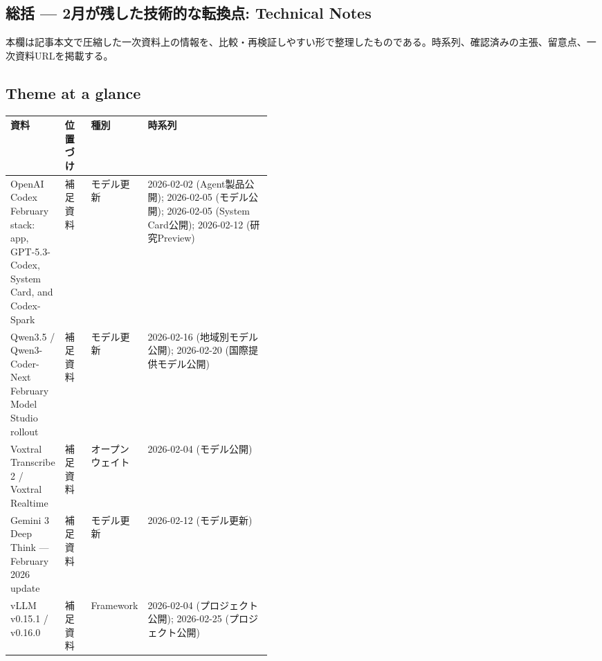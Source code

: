 \subsection*{総括 — 2月が残した技術的な転換点: Technical Notes}
本欄は記事本文で圧縮した一次資料上の情報を、比較・再検証しやすい形で整理したものである。時系列、確認済みの主張、留意点、一次資料URLを掲載する。
\medskip
\subsection*{Theme at a glance}
\begin{center}
\footnotesize
\begin{tabularx}{\linewidth}{@{}p{0.20\linewidth}p{0.10\linewidth}p{0.14\linewidth}X@{}}
\toprule
資料 & 位置づけ & 種別 & 時系列 \\
\midrule
OpenAI Codex February stack: app, GPT-5.3-Codex, System Card, and Codex-Spark & 補足資料 & モデル更新 & 2026-02-02 (Agent製品公開); 2026-02-05 (モデル公開); 2026-02-05 (System Card公開); 2026-02-12 (研究Preview) \\
Qwen3.5 / Qwen3-Coder-Next February Model Studio rollout & 補足資料 & モデル更新 & 2026-02-16 (地域別モデル公開); 2026-02-20 (国際提供モデル公開) \\
Voxtral Transcribe 2 / Voxtral Realtime & 補足資料 & オープンウェイト & 2026-02-04 (モデル公開) \\
Gemini 3 Deep Think — February 2026 update & 補足資料 & モデル更新 & 2026-02-12 (モデル更新) \\
vLLM v0.15.1 / v0.16.0 & 補足資料 & Framework & 2026-02-04 (プロジェクト公開); 2026-02-25 (プロジェクト公開) \\
\bottomrule
\end{tabularx}
\end{center}
\normalsize

